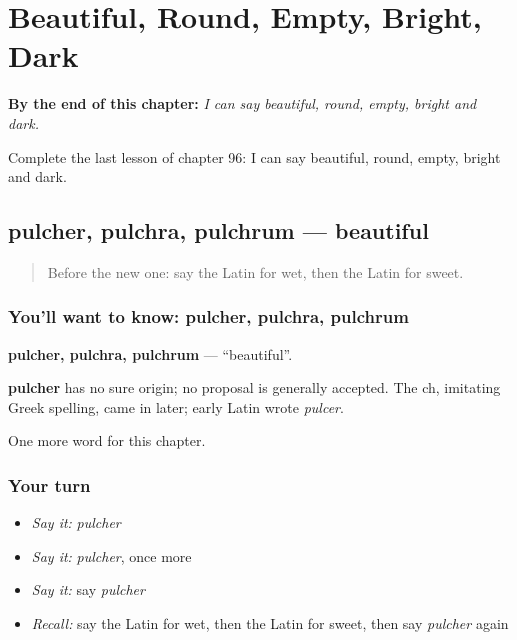 
\chapter{Beautiful, Round, Empty, Bright, Dark}
\label{ch:la-beautiful-round-empty-bright-dark}

\begin{chapteropening}
\textbf{By the end of this chapter:} \emph{I can say beautiful, round, empty, bright and dark.}

Complete the last lesson of chapter 96: I can say beautiful, round, empty, bright and dark.
\end{chapteropening}

\section[pulcher, pulchra, pulchrum]{pulcher, pulchra, pulchrum — beautiful}

\label{lesson:LA-C96-pulcher}



\begin{quote}
Before the new one: say the Latin for wet, then the Latin for sweet.
\end{quote}

\subsection*{You'll want to know: pulcher, pulchra, pulchrum}
\textbf{pulcher, pulchra, pulchrum} — \textquotedblleft{}beautiful\textquotedblright{}.

\begin{cousinweb}
\textbf{pulcher} has no sure origin; no proposal is generally accepted. The ch, imitating Greek spelling, came in later; early Latin wrote \emph{pulcer}.
\end{cousinweb}

\begin{grammarlens}[title={What you've built}]
One more word for this chapter.
\end{grammarlens}

\subsection*{Your turn}
\begin{itemize}
\raggedright
  \item \emph{Say it:} \emph{pulcher}
  \item \emph{Say it:} \emph{pulcher}, once more
  \item \emph{Say it:} say \emph{pulcher}
  \item \emph{Recall:} say the Latin for wet, then the Latin for sweet, then say \emph{pulcher} again
\end{itemize}

